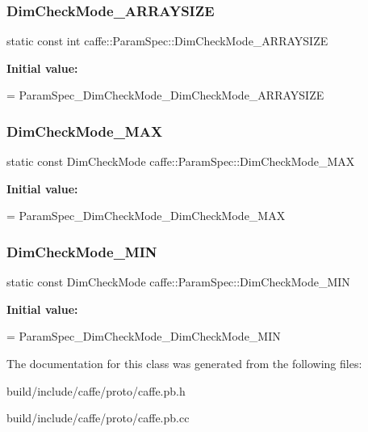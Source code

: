 \subsubsection{\texorpdfstring{Dim\+Check\+Mode\+\_\+\+A\+R\+R\+A\+Y\+S\+I\+ZE}{DimCheckMode\_ARRAYSIZE}}
{\footnotesize\ttfamily static const int caffe\+::\+Param\+Spec\+::\+Dim\+Check\+Mode\+\_\+\+A\+R\+R\+A\+Y\+S\+I\+ZE\hspace{0.3cm}{\ttfamily [static]}}

{\bfseries Initial value\+:}
\begin{DoxyCode}
=
    ParamSpec\_DimCheckMode\_DimCheckMode\_ARRAYSIZE
\end{DoxyCode}
\mbox{\label{classcaffe_1_1_param_spec_a5f737105c5b26070f6a46675a85ef250}} 
\subsubsection{\texorpdfstring{Dim\+Check\+Mode\+\_\+\+M\+AX}{DimCheckMode\_MAX}}
{\footnotesize\ttfamily static const Dim\+Check\+Mode caffe\+::\+Param\+Spec\+::\+Dim\+Check\+Mode\+\_\+\+M\+AX\hspace{0.3cm}{\ttfamily [static]}}

{\bfseries Initial value\+:}
\begin{DoxyCode}
=
    ParamSpec\_DimCheckMode\_DimCheckMode\_MAX
\end{DoxyCode}
\mbox{\label{classcaffe_1_1_param_spec_ae574d1eac033184a91b49e1d87490e49}} 
\subsubsection{\texorpdfstring{Dim\+Check\+Mode\+\_\+\+M\+IN}{DimCheckMode\_MIN}}
{\footnotesize\ttfamily static const Dim\+Check\+Mode caffe\+::\+Param\+Spec\+::\+Dim\+Check\+Mode\+\_\+\+M\+IN\hspace{0.3cm}{\ttfamily [static]}}

{\bfseries Initial value\+:}
\begin{DoxyCode}
=
    ParamSpec\_DimCheckMode\_DimCheckMode\_MIN
\end{DoxyCode}


The documentation for this class was generated from the following files\+:\begin{DoxyCompactItemize}
\item 
build/include/caffe/proto/caffe.\+pb.\+h\item 
build/include/caffe/proto/caffe.\+pb.\+cc\end{DoxyCompactItemize}
